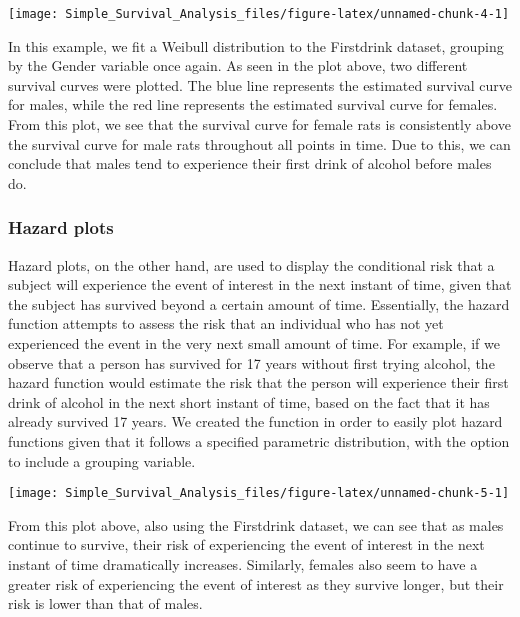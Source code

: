 \begin{Schunk}

\texttt{[image: Simple\_Survival\_Analysis\_files/figure-latex/unnamed-chunk-4-1]} \end{Schunk}

In this example, we fit a Weibull distribution to the Firstdrink
dataset, grouping by the Gender variable once again. As seen in the plot
above, two different survival curves were plotted. The blue line
represents the estimated survival curve for males, while the red line
represents the estimated survival curve for females. From this plot, we
see that the survival curve for female rats is consistently above the
survival curve for male rats throughout all points in time. Due to this,
we can conclude that males tend to experience their first drink of
alcohol before males do.

\hypertarget{hazard-plots}{%
\subsubsection{Hazard plots}\label{hazard-plots}}

Hazard plots, on the other hand, are used to display the conditional
risk that a subject will experience the event of interest in the next
instant of time, given that the subject has survived beyond a certain
amount of time. Essentially, the hazard function attempts to assess the
risk that an individual who has not yet experienced the event in the
very next small amount of time. For example, if we observe that a person
has survived for 17 years without first trying alcohol, the hazard
function would estimate the risk that the person will experience their
first drink of alcohol in the next short instant of time, based on the
fact that it has already survived 17 years. We created the
 function in order to easily plot hazard functions given
that it follows a specified parametric distribution, with the option to
include a grouping variable.

\begin{Schunk}

\texttt{[image: Simple\_Survival\_Analysis\_files/figure-latex/unnamed-chunk-5-1]} \end{Schunk}

From this plot above, also using the Firstdrink dataset, we can see that
as males continue to survive, their risk of experiencing the event of
interest in the next instant of time dramatically increases. Similarly,
females also seem to have a greater risk of experiencing the event of
interest as they survive longer, but their risk is lower than that of
males.

